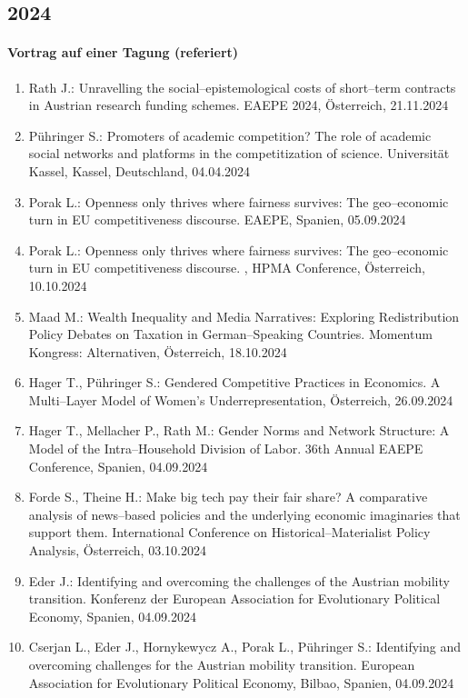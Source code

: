 \subsection*{2024}
\paragraph{Vortrag auf einer Tagung (referiert)}
\begin{enumerate}
	\item Rath J.: Unravelling the social--epistemological costs of short--term contracts in Austrian research funding schemes. EAEPE 2024, Österreich, 21.11.2024
	\item Pühringer S.: Promoters of academic competition? The role of academic social networks and platforms in the competitization of science. Universität Kassel, Kassel, Deutschland, 04.04.2024
	\item Porak L.: Openness only thrives where fairness survives: The geo--economic turn in EU competitiveness discourse. EAEPE, Spanien, 05.09.2024
	\item Porak L.: Openness only thrives where fairness survives: The geo--economic turn in EU competitiveness discourse. , HPMA Conference, Österreich, 10.10.2024
	\item Maad M.: Wealth Inequality and Media Narratives: Exploring Redistribution Policy Debates on Taxation in German--Speaking Countries. Momentum Kongress: Alternativen, Österreich, 18.10.2024
	\item Hager T., Pühringer S.: Gendered Competitive Practices in Economics. A Multi--Layer Model of Women’s Underrepresentation, Österreich, 26.09.2024
	\item Hager T., Mellacher P., Rath M.: Gender Norms and Network Structure: A Model of the Intra--Household Division of Labor. 36th Annual EAEPE Conference, Spanien, 04.09.2024
	\item Forde S., Theine H.: Make big tech pay their fair share? A comparative analysis of news--based policies and the underlying economic imaginaries that support them. International Conference on Historical--Materialist Policy Analysis, Österreich, 03.10.2024
	\item Eder J.: Identifying and overcoming the challenges of the Austrian mobility transition. Konferenz der European Association for Evolutionary Political Economy, Spanien, 04.09.2024
	\item Cserjan L., Eder J., Hornykewycz A., Porak L., Pühringer S.: Identifying and overcoming challenges for the Austrian mobility transition. European Association for Evolutionary Political Economy, Bilbao, Spanien, 04.09.2024

\end{enumerate}

